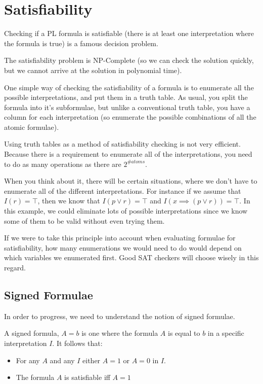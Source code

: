 \section{Satisfiability}

Checking if a PL formula is satisfiable (there is at least one interpretation
where the formula is true) is a famous decision problem.

The satisfiability problem is NP-Complete (so we can check the solution quickly,
but we cannot arrive at the solution in polynomial time).

One simple way of checking the satisfiability of a formula is to enumerate all
the possible interpretations, and put them in a truth table. As usual, you split
the formula into it's subformulae, but unlike a conventional truth table, you
have a column for each interpretation (so enumerate the possible combinations of
all the atomic formulae).

Using truth tables as a method of satisfiability checking is not very
efficient. Because there is a requirement to enumerate all of the
interpretations, you need to do as many operations as there are $2^{\#atoms}$.

When you think about it, there will be certain situations, where we don't have
to enumerate all of the different interpretations. For instance if we assume
that $I(r) = \top$, then we know that $I(p \vee r) = \top$ and $I(x \implies (p
\vee r)) = \top$. In this example, we could eliminate lots of possible
interpretations since we know some of them to be valid without even trying them.

If we were to take this principle into account when evaluating formulae for
satisfiability, how many enumerations we would need to do would depend on which
variables we enumerated first. Good SAT checkers will choose wisely in this
regard.

\subsection{Signed Formulae}

In order to progress, we need to understand the notion of signed formulae.

A signed formula, $A = b$ is one where the formula $A$ is equal to $b$ in a
specific interpretation $I$. It follows that:

\begin{itemize}
  \item For any $A$ and any $I$ either $A = 1$ or $A = 0$ in $I$.
  \item The formula $A$ is satisfiable iff $A = 1$
\end{itemize}

